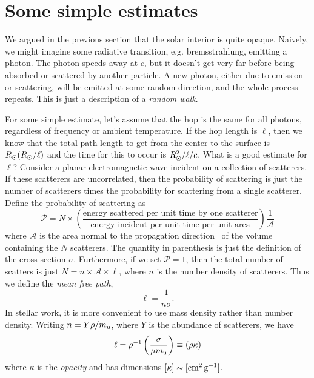 \section{Some simple estimates}

We argued in the previous section that the solar interior is quite opaque. Naively, we might imagine some radiative transition, e.g. bremsstrahlung, emitting a photon.  The photon speeds away at $c$, but it doesn't get very far before being absorbed or scattered by another particle. A new photon, either due to emission or scattering, will be emitted at some random direction, and the whole process repeats. This is just a description of a \emph{random walk}. 

For some simple estimate, let's assume that the hop is the same for all photons, regardless of frequency or ambient temperature. If the hop length is $\ell$, then we know that the total path length to get from the center to the surface is $R_{\odot}(R_{\odot}/\ell)$ and the time for this to occur is $R_{\odot}^{2}/\ell/c$. What is a good estimate for $\ell$?  Consider a planar electromagnetic wave incident on a collection of scatterers. If these scatterers are uncorrelated, then the probability of scattering is just the number of scatterers times the probability for scattering from a single scatterer.  Define the probability of scattering as
\begin{equation}\label{e.scattering-probability}
\mathcal{P} = N\times\left(\frac{\textrm{energy scattered per unit time by one scatterer}}{\textrm{energy incident per unit time per unit area}}\right)\frac{1}{ \mathcal{A}}
\end{equation}
where $\mathcal{A}$ is the area normal to the propagation direction \unitk\ of the volume containing the $N$ scatterers.  The quantity in parenthesis is just the definition of the cross-section $\sigma$. Furthermore, if we set $\mathcal{P} = 1$, then the total number of scatters is just $N = n\times \mathcal{A}\times \ell$, where $n$ is the number density of scatterers. Thus we define the \emph{mean free path},
\begin{equation}\label{e.mean-free-path}
\ell = \frac{1}{n\sigma}.
\end{equation}
In stellar work, it is more convenient to use mass density rather than number density.  Writing $n = Y\rho/m_\mathrm{u}$, where $Y$ is the abundance of scatterers, we have
\[ \ell = \rho^{-1} \left(\frac{\sigma}{\mu m_\mathrm{u}}\right) \equiv (\rho\kappa) \]
where $\kappa$ is the \emph{opacity} and has dimensions $[\kappa]\sim[\mathrm{c}\mathrm{m}^{2}\,\mathrm{g}^{-1}]$.

